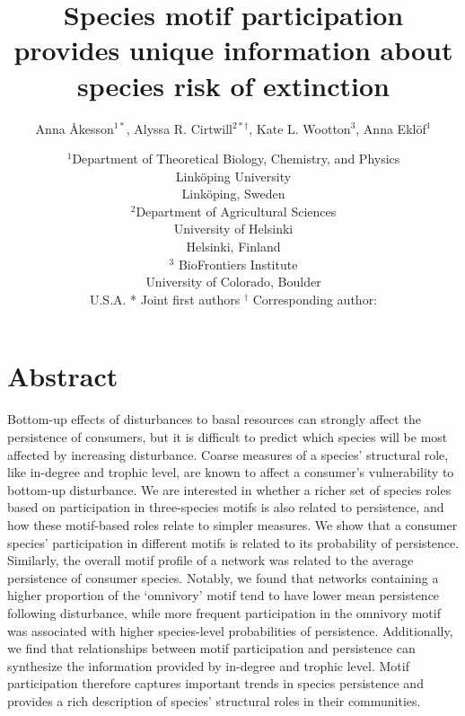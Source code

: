 \documentclass[12pt]{article}
\title{Species motif participation provides unique information about species risk of extinction}
\author{Anna \r{A}kesson$^{1*}$, Alyssa R. Cirtwill$^{2*\dagger}$, Kate L. Wootton$^{3}$, Anna Ekl\"{o}f$^{1}$}
\date{\small$^1$Department of Theoretical Biology, Chemistry, and Physics\\ 
Link\"{o}ping University\\
Link\"{o}ping, Sweden\\
\medskip
\small$^2$Department of Agricultural Sciences\\
University of Helsinki\\
Helsinki, Finland\\
\medskip
\small$^3$ BioFrontiers Institute\\
University of Colorado, Boulder\\
U.S.A.
\medskip
* Joint first authors
\medskip
$^\dagger$ Corresponding author:\\

}
\begin{document}
 
\maketitle 
\linenumbers
\raggedright

\setlength{\parindent}{15pt} 


\section*{Abstract}


    Bottom-up effects of disturbances to basal resources can strongly affect the persistence of consumers, but it is difficult to predict which species will be most affected by increasing disturbance.
    Coarse measures of a species' structural role, like in-degree and trophic level, are known to affect a consumer's vulnerability to bottom-up disturbance.
    We are interested in whether a richer set of species roles based on participation in three-species motifs is also related to persistence, and how these motif-based roles relate to simpler measures.
    We show that a consumer species' participation in different motifs is related to its probability of persistence. 
    Similarly, the overall motif profile of a network was related to the average persistence of consumer species.
    Notably, we found that networks containing a higher proportion of the `omnivory' motif tend to have lower mean persistence following disturbance, while more frequent participation in the omnivory motif was associated with higher species-level probabilities of persistence.
    Additionally, we find that relationships between motif participation and persistence can synthesize the information provided by in-degree and trophic level.
    Motif participation therefore captures important trends in species persistence and provides a rich description of species' structural roles in their communities.
\end{document}

